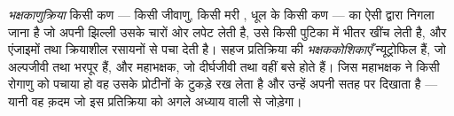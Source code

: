 \begin{definition}[भक्षकाणुक्रिया]\label{def:g12:innate-immunity:phagocytosis}
\emph{भक्षकाणुक्रिया} किसी कण --- किसी जीवाणु, किसी
मरी , धूल के किसी कण --- का ऐसी  द्वारा निगला जाना है जो अपनी
झिल्ली उसके चारों ओर लपेट लेती है, उसे किसी पुटिका में भीतर खींच लेती है,
और एंजाइमों तथा क्रियाशील रसायनों से पचा देती है। सहज प्रतिक्रिया की
\emph{भक्षककोशिकाएँ} न्यूट्रोफिल हैं, जो अल्पजीवी तथा
भरपूर हैं, और महाभक्षक, जो दीर्घजीवी तथा वहीं बसे होते हैं। जिस महाभक्षक ने
किसी रोगाणु को पचाया हो वह उसके प्रोटीनों के टुकड़े रख लेता है और उन्हें अपनी
सतह पर दिखाता है --- यानी वह क़दम जो इस प्रतिक्रिया को अगले अध्याय वाली से
जोड़ेगा।
\end{definition}


